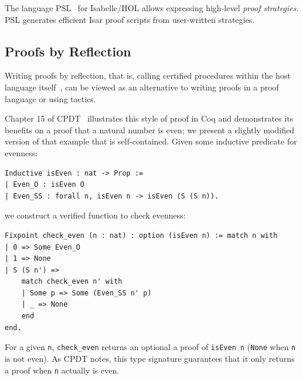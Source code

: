 The language PSL~\citep{Nagashima2017} for Isabelle/HOL allows expressing high-level \emph{proof strategies}. PSL generates efficient Isar proof scripts
from user-written strategies.


\subsection{Proofs by Reflection}
\label{sec:refl}

Writing proofs by reflection, that is, calling certified procedures within the host language itself~\citep{Allen1990}, can be viewed as an alternative to writing proofs in a proof language or using tactics. 

Chapter 15 of CPDT~\citep{CPDT} illustrates this style of proof in Coq and demonstrates its benefits on a proof that a natural number is even;
we present a slightly modified version of that example that is self-contained.
Given some inductive predicate for evenness:
\begin{lstlisting}
Inductive isEven : nat -> Prop :=
| Even_O : isEven O
| Even_SS : forall n, isEven n -> isEven (S (S n)).
\end{lstlisting}
we construct a verified function to check evenness:
\begin{lstlisting}
Fixpoint check_even (n : nat) : option (isEven n) := match n with
| 0 => Some Even_O
| 1 => None
| S (S n') => 
    match check_even n' with
    | Some p => Some (Even_SS n' p)
    | _ => None
    end
end.
\end{lstlisting}
For a given \lstinline{n}, \lstinline{check_even} returns an optional a proof of \lstinline{isEven n} (\lstinline{None} when \lstinline{n}
is not even). As CPDT notes, this type signature guarantees that it only returns a proof when \lstinline{n}
actually is even. %

